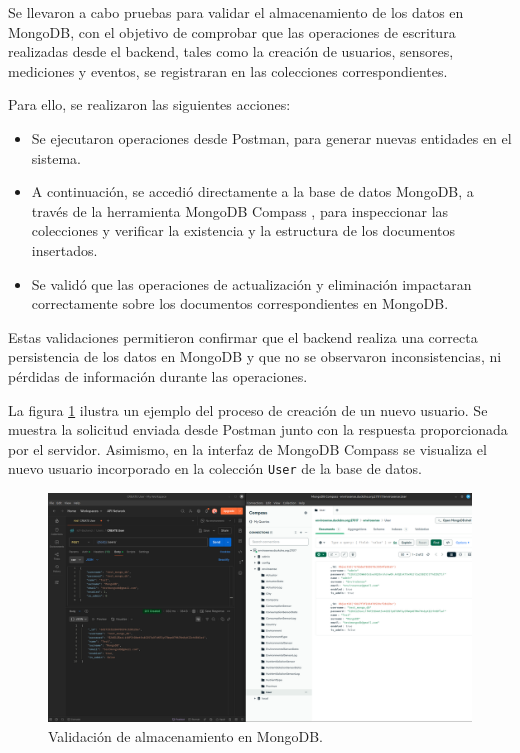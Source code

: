 Se llevaron a cabo pruebas para validar el almacenamiento de los datos en
MongoDB, con el objetivo de comprobar que las operaciones de escritura
realizadas desde el backend, tales como la creación de usuarios, sensores,
mediciones y eventos, se registraran en las colecciones correspondientes.

Para ello, se realizaron las siguientes acciones:

\begin{itemize}
    \item Se ejecutaron operaciones desde Postman, para generar nuevas entidades en el
          sistema.
    \item A continuación, se accedió directamente a la base de datos MongoDB, a través de
          la herramienta MongoDB Compass \cite{MongoDBCompass}, para inspeccionar las
          colecciones y verificar la existencia y la estructura de los documentos
          insertados.
    \item Se validó que las operaciones de actualización y eliminación impactaran
          correctamente sobre los documentos correspondientes en MongoDB.
\end{itemize}

Estas validaciones permitieron confirmar que el backend realiza una correcta
persistencia de los datos en MongoDB y que no se observaron inconsistencias, ni
pérdidas de información durante las operaciones.

La figura \ref{fig:mongodb} ilustra un ejemplo del proceso de creación de un
nuevo usuario. Se muestra la solicitud enviada desde Postman junto con la
respuesta proporcionada por el servidor. Asimismo, en la interfaz de MongoDB
Compass se visualiza el nuevo usuario incorporado en la colección \texttt{User}
de la base de datos.

\begin{figure}[H]
    \centering
    \includegraphics[width=\textwidth]{Images/39_test_mongodb.png}
    \caption[Validación de almacenamiento en MongoDB]{Validación de almacenamiento en MongoDB.}
    \label{fig:mongodb}
\end{figure}

